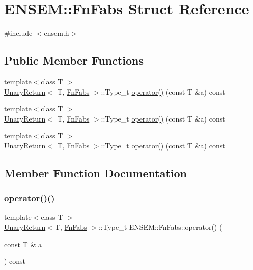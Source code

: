 \hypertarget{structENSEM_1_1FnFabs}{}\section{E\+N\+S\+EM\+:\+:Fn\+Fabs Struct Reference}
\label{structENSEM_1_1FnFabs}


{\ttfamily \#include $<$ensem.\+h$>$}

\subsection*{Public Member Functions}
\begin{DoxyCompactItemize}
\item 
{\footnotesize template$<$class T $>$ }\\\mbox{\hyperlink{structENSEM_1_1UnaryReturn}{Unary\+Return}}$<$ T, \mbox{\hyperlink{structENSEM_1_1FnFabs}{Fn\+Fabs}} $>$\+::Type\+\_\+t \mbox{\hyperlink{structENSEM_1_1FnFabs_a655393f2e089d6fb5f266991b83ffb12}{operator()}} (const T \&a) const
\item 
{\footnotesize template$<$class T $>$ }\\\mbox{\hyperlink{structENSEM_1_1UnaryReturn}{Unary\+Return}}$<$ T, \mbox{\hyperlink{structENSEM_1_1FnFabs}{Fn\+Fabs}} $>$\+::Type\+\_\+t \mbox{\hyperlink{structENSEM_1_1FnFabs_a655393f2e089d6fb5f266991b83ffb12}{operator()}} (const T \&a) const
\item 
{\footnotesize template$<$class T $>$ }\\\mbox{\hyperlink{structENSEM_1_1UnaryReturn}{Unary\+Return}}$<$ T, \mbox{\hyperlink{structENSEM_1_1FnFabs}{Fn\+Fabs}} $>$\+::Type\+\_\+t \mbox{\hyperlink{structENSEM_1_1FnFabs_a655393f2e089d6fb5f266991b83ffb12}{operator()}} (const T \&a) const
\end{DoxyCompactItemize}


\subsection{Member Function Documentation}
\mbox{\label{structENSEM_1_1FnFabs_a655393f2e089d6fb5f266991b83ffb12}} 
\subsubsection{\texorpdfstring{operator()()}{operator()()}\hspace{0.1cm}{\footnotesize\ttfamily [1/3]}}
{\footnotesize\ttfamily template$<$class T $>$ \\
\mbox{\hyperlink{structENSEM_1_1UnaryReturn}{Unary\+Return}}$<$T, \mbox{\hyperlink{structENSEM_1_1FnFabs}{Fn\+Fabs}} $>$\+::Type\+\_\+t E\+N\+S\+E\+M\+::\+Fn\+Fabs\+::operator() (\begin{DoxyParamCaption}\item[{const T \&}]{a }\end{DoxyParamCaption}) const\hspace{0.3cm}{\ttfamily [inline]}}

